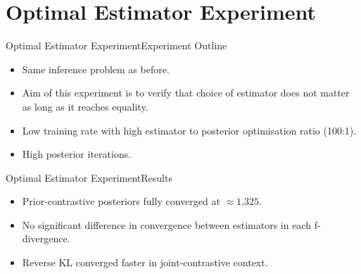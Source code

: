 \documentclass{beamer}
\begin{document}
\section{Optimal Estimator Experiment}
\begin{frame}{Optimal Estimator Experiment}{Experiment Outline}
\begin{itemize}
\item Same inference problem as before.
\item Aim of this experiment is to verify that choice of estimator does not matter as long as it reaches equality.
\item Low training rate with high estimator to posterior optimisation ratio (100:1).
\item High posterior iterations.
\end{itemize}
\end{frame}
\begin{frame}{Optimal Estimator Experiment}{Results}
\begin{table}[h]
\end{table}
\begin{itemize}
\item Prior-contrastive posteriors fully converged at $\approx 1.325$.
\item No significant difference in convergence between estimators in each f-divergence.
\item Reverse KL converged faster in joint-contrastive context.
\end{itemize}
\end{frame}
\end{document}
